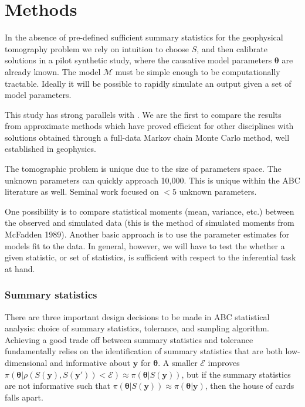 \chapter{Methods}

In the absence of pre-defined sufficient summary statistics for the geophysical tomography problem we rely on intuition to choose $S$, and then calibrate solutions in a pilot synthetic study, where the causative model parameters $\bm{\theta}$ are already known. The model $\mathcal{M}$ must be simple enough to be computationally tractable. Ideally it will be possible to rapidly simulate an output given a set of model parameters.  

This study has strong parallels with \citet{Beaumont2002}. We are the first to compare the results from approximate methods which have proved efficient for other disciplines with solutions obtained through a full-data Markov chain Monte Carlo method, well established in geophysics.

The tomographic problem is unique due to the size of parameters space. The unknown parameters can quickly approach 10,000. This is unique within the ABC literature as well. Seminal work focused on $<5$ unknown parameters.

One possibility is to compare statistical moments (mean, variance, etc.) between the observed and simulated data (this is the method of simulated moments from McFadden 1989). Another basic approach is to use the parameter estimates for models fit to the data. In general, however, we will have to test the whether a given statistic, or set of statistics, is sufficient with respect to the inferential task at hand. 



\subsection{Summary statistics}
There are three important design decisions to be made in ABC statistical analysis: choice of summary statistics, tolerance, and sampling algorithm. Achieving a good trade off between summary statistics and tolerance fundamentally relies on the identification of summary statistics that are both low-dimensional and informative about $\bm{y}$ for $\bm{\theta}$. A smaller $\mathcal{E}$ improves $\pi(\bm{\theta}|\rho(S(\bm{y}),S(\bm{y'}))<\mathcal{E}) \approx \pi(\bm{\theta}|S(\bm{y}))$, but if the summary statistics are not informative such that $\pi(\bm{\theta}|S(\bm{y})) \approx \pi(\bm{\theta}|\bm{y})$, then the house of cards falls apart.
